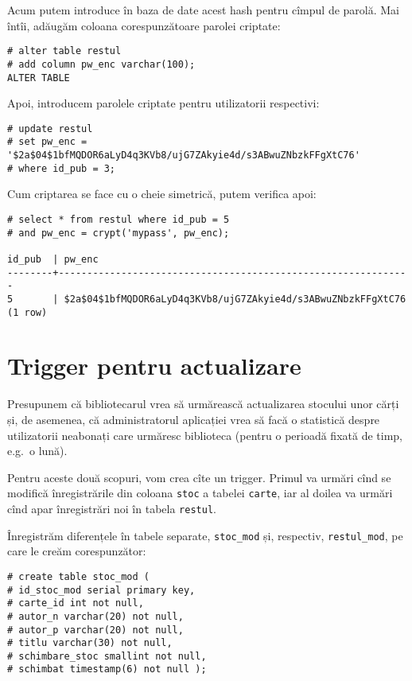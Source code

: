 Acum putem introduce în baza de date acest hash pentru cîmpul de parolă.
Mai întîi, adăugăm coloana corespunzătoare parolei criptate:

{
  \small
\begin{verbatim}
# alter table restul
# add column pw_enc varchar(100);
ALTER TABLE
\end{verbatim}
}

Apoi, introducem parolele criptate pentru utilizatorii respectivi:

{
  \small
\begin{verbatim}
# update restul
# set pw_enc = '$2a$04$1bfMQDOR6aLyD4q3KVb8/ujG7ZAkyie4d/s3ABwuZNbzkFFgXtC76' 
# where id_pub = 3;
\end{verbatim}
}

Cum criptarea se face cu o cheie simetrică, putem verifica apoi:

{
  \small
\begin{verbatim}
# select * from restul where id_pub = 5 
# and pw_enc = crypt('mypass', pw_enc);

id_pub  | pw_enc
--------+--------------------------------------------------------------
5       | $2a$04$1bfMQDOR6aLyD4q3KVb8/ujG7ZAkyie4d/s3ABwuZNbzkFFgXtC76
(1 row)
\end{verbatim}
}

\section{Trigger pentru actualizare}

Presupunem că bibliotecarul vrea să urmărească actualizarea stocului
unor cărți și, de asemenea, că administratorul aplicației vrea să facă
o statistică despre utilizatorii neabonați care urmăresc biblioteca
(pentru o perioadă fixată de timp, e.g.\ o lună).

Pentru aceste două scopuri, vom crea cîte un trigger. Primul va urmări
cînd se modifică înregistrările din coloana \texttt{stoc} a tabelei
\texttt{carte}, iar al doilea va urmări cînd apar înregistrări noi în
tabela \texttt{restul}.

Înregistrăm diferențele în tabele separate, \texttt{stoc\_mod} și,
respectiv, \texttt{restul\_mod}, pe care le creăm corespunzător:

{
  \small
\begin{verbatim}
# create table stoc_mod (
# id_stoc_mod serial primary key,
# carte_id int not null,
# autor_n varchar(20) not null,
# autor_p varchar(20) not null,
# titlu varchar(30) not null,
# schimbare_stoc smallint not null,
# schimbat timestamp(6) not null );
\end{verbatim}
}

